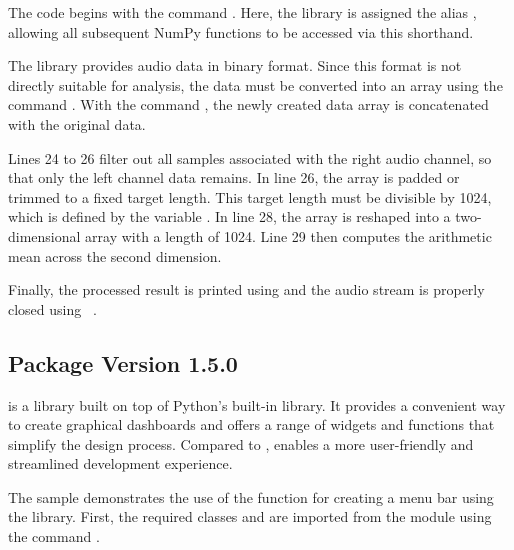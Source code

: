 The code begins with the command .  
Here, the library is assigned the alias , allowing all subsequent NumPy functions to be accessed via this shorthand.

The  library provides audio data in binary format.  
Since this format is not directly suitable for analysis, the data must be converted into an array using the command .  
With the command , the newly created data array is concatenated with the original data.

Lines 24 to 26 filter out all samples associated with the right audio channel, so that only the left channel data remains.  
In line 26, the array is padded or trimmed to a fixed target length.  
This target length must be divisible by 1024, which is defined by the variable .  
In line 28, the array is reshaped into a two-dimensional array with a length of 1024.  
Line 29 then computes the arithmetic mean across the second dimension.

Finally, the processed result is printed using  and the audio stream is properly closed using ~\cite{Numpy:2022}.


\subsection{Package  Version 1.5.0}

 is a library built on top of Python’s built-in  library.  
It provides a convenient way to create graphical dashboards and offers a range of widgets and functions that simplify the design process.  
Compared to ,  enables a more user-friendly and streamlined development experience.

\begin{code}[!htp]
	\caption{Create a simple GUI with menu options using guizero library} 
	\label{Code:Python:File:SimpleMenuGuiApp}
\end{code}    

The sample demonstrates the use of the function for creating a menu bar using the  library.  
First, the required classes  and  are imported from the  module using the command .

